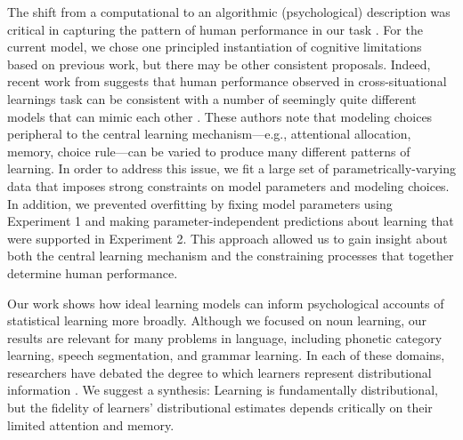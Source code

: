 \documentclass{pnastwo}
\begin{document}
\begin{article}
The shift from a computational to an algorithmic (psychological) description was critical in capturing the pattern of human performance in our task \citep{Marr1982,Frank2010a,Yurovsky2012c}. For the current model, we chose one principled instantiation of cognitive limitations based on previous work, but there may be other consistent proposals. Indeed, recent work from \citep{Yu2012b} suggests that human performance observed in cross-situational learnings task can be consistent with a number of seemingly quite different models that can mimic each other \citep[see also,][]{Townsend1990}. These authors note that modeling choices peripheral to the central learning mechanism---e.g., attentional allocation, memory, choice rule---can be varied to produce many different patterns of learning. In order to address this issue, we fit a large set of parametrically-varying data that imposes strong constraints on model parameters and modeling choices. In addition, we prevented overfitting by fixing model parameters using Experiment 1 and making parameter-independent predictions about learning that were supported in Experiment 2. This approach allowed us to gain insight about both the central learning mechanism and the constraining processes that together determine human performance.

Our work shows how ideal learning models can inform psychological accounts of statistical learning more broadly. Although we focused on noun learning, our results are relevant for many problems in language, including phonetic category learning, speech segmentation, and grammar learning. In each of these domains, researchers have debated the degree to which learners represent distributional information \citep{Endress2005, Frank2010a, McMurray2013}. We suggest a synthesis: Learning is fundamentally distributional, but the fidelity of learners' distributional estimates depends critically on their limited attention and memory.
%
%

\begin{materials}


\end{materials}
\end{article}
\end{document}

